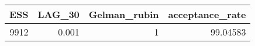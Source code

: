 \begin{longtable}{rrrr}
\toprule
ESS & LAG\_30 & Gelman\_rubin & acceptance\_rate \\ 
\midrule
9912 & 0.001 & 1 & 99.04583 \\ 
\bottomrule
\end{longtable}

